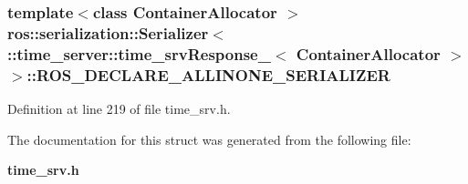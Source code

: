 \subsubsection[{\-R\-O\-S\-\_\-\-D\-E\-C\-L\-A\-R\-E\-\_\-\-A\-L\-L\-I\-N\-O\-N\-E\-\_\-\-S\-E\-R\-I\-A\-L\-I\-Z\-E\-R}]{\setlength{\rightskip}{0pt plus 5cm}template$<$class Container\-Allocator $>$ ros\-::serialization\-::\-Serializer$<$ \-::{\bf time\-\_\-server\-::time\-\_\-srv\-Response\-\_\-}$<$ \-Container\-Allocator $>$ $>$\-::{\bf \-R\-O\-S\-\_\-\-D\-E\-C\-L\-A\-R\-E\-\_\-\-A\-L\-L\-I\-N\-O\-N\-E\-\_\-\-S\-E\-R\-I\-A\-L\-I\-Z\-E\-R}}\label{structros_1_1serialization_1_1Serializer_3_01_1_1time__server_1_1time__srvResponse___3_01ContainerAllocator_01_4_01_4_adcc403abe21c0c82a21dafc20bf6de76}


\-Definition at line 219 of file time\-\_\-srv.\-h.



\-The documentation for this struct was generated from the following file\-:\begin{DoxyCompactItemize}
\item 
{\bf time\-\_\-srv.\-h}\end{DoxyCompactItemize}
